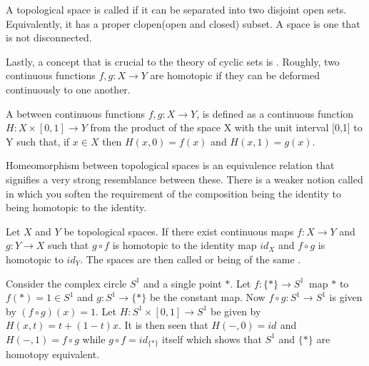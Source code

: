 \documentclass[../../main.tex]{subfiles}
\begin{document}
    A topological space is called  if it can be separated into two disjoint open sets. Equivalently, it has a proper clopen(open and closed) subset. A  space is one that is not disconnected.

    Lastly, a concept that is crucial to the theory of cyclic sets is . Roughly, two continuous functions $f, g: X \to Y$ are homotopic if they can be deformed continuously to one another.

    \begin{definition}
        A  between continuous functions $f,g: X\to Y$, is defined as a continuous function  $H : X \times [0,1] \to Y$ from the product of the space X with the unit interval [0,1] to Y such that, if $x \in X$ then $H(x,0) = f(x)$ and $H(x,1) = g(x)$.
    \end{definition}

    Homeomorphism between topological spaces is an equivalence relation that signifies a very strong resemblance between these. There is a weaker notion called  in which you soften the requirement of the composition being the identity to being homotopic to the identity.

    \begin{definition}
        Let $X$ and $Y$ be topological spaces. If there exist continuous maps $f : X \to Y$ and $g : Y \to X$ such that $g \circ f$ is homotopic to the identity map $id_X$ and $f \circ g$ is homotopic to $id_Y$. The spaces are then called  or being of the same .
    \end{definition}

    \begin{example}
        Consider the complex circle $S^1$ and a single point $*$. Let $f: \{*\} \to S^1$ map $*$ to $f(*) = 1 \in S^1$ and $g: S^1 \to \{*\}$ be the constant map. Now $f \circ g: S^1 \to S^1$ is given by $(f \circ g)(x) = 1$. Let $H: S^1 \times [0, 1] \to S^1$ be given by $H(x, t) = t + (1-t)x$. It is then seen that $H(-, 0) = id_{}$ and $H(-, 1) = f \circ g$ while $g \circ f = id_{\{*\}}$ itself which shows that $S^1$ and $\{*\}$ are homotopy equivalent.
    \end{example}
\end{document}
